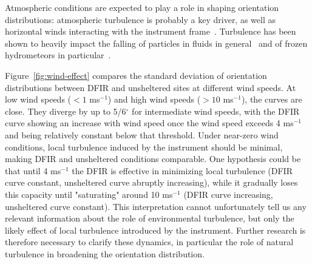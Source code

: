 \documentclass[draft]{agujournal2019}
\begin{document}
Atmospheric conditions are expected to play a role in shaping orientation distributions: atmospheric turbulence is probably a key driver, as well as horizontal winds interacting with the instrument frame~\cite{Fitch_AMT_2021}. Turbulence has been shown to heavily impact the falling of particles in fluids in general~\cite{Petersen_JFM_2019,Brandt_ARFM_2022} and of frozen hydrometeors in particular~\cite{Nemes_JFM_2017,Li_JFM_2021}.

 Figure~\ref{fig:wind-effect} compares the standard deviation of orientation distributions between DFIR and unsheltered sites at different wind speeds. At low wind speeds ($<1$ ms$^{-1}$) and high wind speeds ($>10$ ms$^{-1}$), the curves are close. They diverge by up to 5/6$^\circ$ for intermediate wind speeds, with the DFIR curve showing an increase with wind speed once the wind speed exceeds 4 ms$^{-1}$ and being relatively constant below that threshold. Under near-zero wind conditions, local turbulence induced by the instrument  should be minimal, making DFIR and unsheltered conditions comparable. One hypothesis could be that until 4 ms$^{-1}$ the DFIR is effective in minimizing local turbulence (DFIR curve constant, unsheltered curve abruptly increasing), while it gradually loses this capacity until "saturating" around 10 ms$^{-1}$ (DFIR curve increasing, unsheltered curve constant). This interpretation cannot unfortunately tell us any relevant information about the role of environmental turbulence, but only the likely effect of local turbulence introduced by the instrument.  Further research is therefore necessary to clarify these dynamics, in particular the role of natural turbulence in broadening the orientation distribution.
\end{document}
